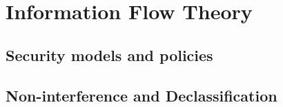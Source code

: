 
\section{Information Flow Theory}

\subsection{Security models and policies}
\subsection{Non-interference and Declassification}
\newpage
